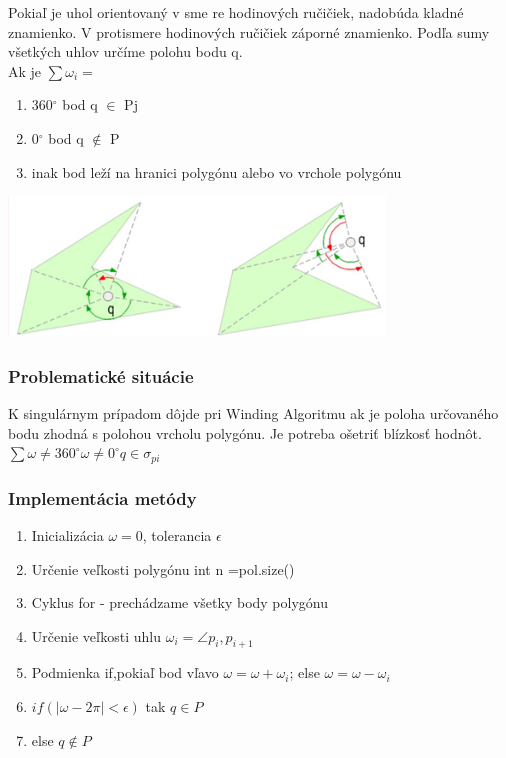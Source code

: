 \documentclass[12pt]{article}
\begin{document}
Pokiaľ je uhol orientovaný v sme re hodinových ručičiek, nadobúda kladné znamienko. V protismere hodinových ručičiek záporné znamienko. Podľa sumy všetkých uhlov určíme polohu bodu q.\\[2pt]

Ak je $\sum \omega_i = $
\begin{enumerate}
\item 360$^\circ$ bod q $\in$ Pj
\item 0$^\circ$ bod q $\notin$ P
\item inak bod leží na hranici polygónu alebo vo vrchole polygónu
\end{enumerate}

\begin{center}
   \includegraphics[width=10cm]{./img/windin_alg.png}
\end{center}	

\subsubsection{Problematické situácie}
K singulárnym prípadom dôjde pri Winding Algoritmu ak je poloha určovaného bodu zhodná s polohou vrcholu polygónu. Je potreba ošetriť blízkosť hodnôt.
$\sum \omega \neq360^\circ \omega \neq 0^\circ q \in \sigma_{pi}$

\subsubsection{Implementácia metódy}
\begin{enumerate}
\item Inicializácia $\omega = 0$, tolerancia $\epsilon$ 
\item Určenie veľkosti polygónu int n =pol.size()
\item Cyklus for - prechádzame všetky body polygónu
\item Určenie veľkosti uhlu $\omega_i = \angle p_i,p_{i+1} $
\item[] Podmienka if,pokiaľ bod vľavo $\omega = \omega + \omega_i$; else $\omega = \omega - \omega_i$
\item $if(|\omega-2\pi|< \epsilon)$  tak $q \in P$
\item else $q \notin P$
\end{enumerate}
\end{document}
